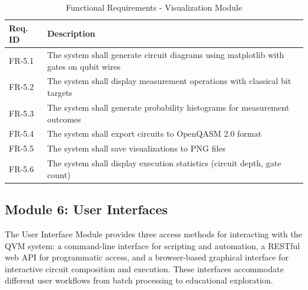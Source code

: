 \begin{table}[H]
\centering
\caption{Functional Requirements - Visualization Module}
\begin{tabular}{|p{2cm}|p{11cm}|}
\hline
\textbf{Req. ID} & \textbf{Description} \\
\hline
FR-5.1 & The system shall generate circuit diagrams using matplotlib with gates on qubit wires \\
\hline
FR-5.2 & The system shall display measurement operations with classical bit targets \\
\hline
FR-5.3 & The system shall generate probability histograms for measurement outcomes \\
\hline
FR-5.4 & The system shall export circuits to OpenQASM 2.0 format \\
\hline
FR-5.5 & The system shall save visualizations to PNG files \\
\hline
FR-5.6 & The system shall display execution statistics (circuit depth, gate count) \\
\hline
\end{tabular}
\end{table}

\subsection{Module 6: User Interfaces}

The User Interface Module provides three access methods for interacting with the QVM system: a command-line interface for scripting and automation, a RESTful web API for programmatic access, and a browser-based graphical interface for interactive circuit composition and execution. These interfaces accommodate different user workflows from batch processing to educational exploration.

